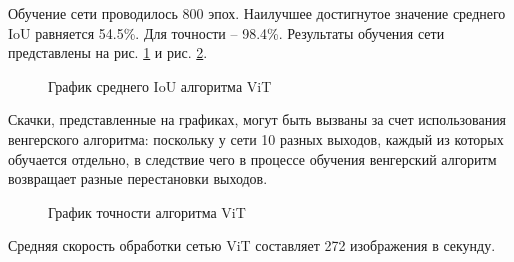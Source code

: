 \documentclass[14pt,a4paper]{extarticle}
\begin{document}
Обучение сети проводилось 800 эпох. Наилучшее достигнутое значение среднего IoU равняется 54.5\%. Для точности  -- 98.4\%. Результаты обучения сети представлены на рис. \ref{mIoU} и рис. \ref{Acc}.

\begin{figure}[h!]
\caption{График среднего IoU алгоритма ViT}
\label{mIoU}
\end{figure} 
\newpage
Скачки, представленные на графиках, могут быть вызваны за счет использования венгерского алгоритма: поскольку у сети 10 разных выходов, каждый из которых обучается отдельно, в следствие чего в процессе обучения венгерский алгоритм возвращает разные перестановки выходов.

\begin{figure}[h!]
\caption{График точности алгоритма ViT}
\label{Acc}
\end{figure} 
Средняя скорость обработки сетью ViT составляет 272 изображения в секунду.
\end{document}
